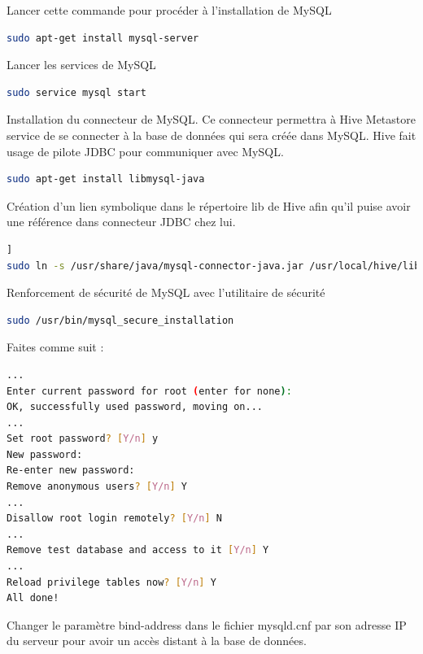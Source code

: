 \documentclass[12pt,english]{book}
\begin{document}
Lancer cette commande pour procéder à l’installation de MySQL

\begin{lstlisting}[language=bash, frame=single]
sudo apt-get install mysql-server
\end{lstlisting}

Lancer les services de MySQL

\begin{lstlisting}[language=bash, frame=single]
sudo service mysql start
\end{lstlisting}

Installation du connecteur de MySQL.
Ce connecteur permettra à Hive Metastore service de se connecter à la base de données qui sera créée dans MySQL.
Hive fait usage de pilote JDBC pour communiquer avec MySQL.

\begin{lstlisting}[language=bash, frame=single]
sudo apt-get install libmysql-java
\end{lstlisting}

Création d’un lien symbolique dans le répertoire lib de Hive afin qu’il puise avoir une référence dans connecteur JDBC chez lui.

\begin{lstlisting}[language=bash, frame=single, breaklines=true, postbreak=\mbox{\textcolor{red}{$\hookrightarrow$}\space}]]
sudo ln -s /usr/share/java/mysql-connector-java.jar /usr/local/hive/lib/mysql-connector-java.jar
\end{lstlisting}

Renforcement de sécurité de MySQL avec l’utilitaire de sécurité

\begin{lstlisting}[language=bash, frame=single]
sudo /usr/bin/mysql_secure_installation
\end{lstlisting}

Faites comme suit :

\begin{lstlisting}[language=bash, frame=single]
...
Enter current password for root (enter for none):
OK, successfully used password, moving on...
...
Set root password? [Y/n] y
New password:
Re-enter new password:
Remove anonymous users? [Y/n] Y
...
Disallow root login remotely? [Y/n] N
...
Remove test database and access to it [Y/n] Y
...
Reload privilege tables now? [Y/n] Y
All done!
\end{lstlisting}

Changer le paramètre bind-address dans le fichier mysqld.cnf par son adresse IP du serveur pour avoir un accès distant à la base de données.
\end{document}
